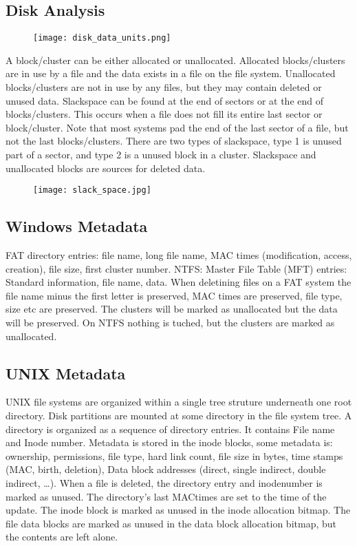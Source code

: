 \subsection{Disk Analysis}
\begin{figure}[h]
    \centering\texttt{[image: disk\_data\_units.png]}
\end{figure}
A block/cluster can be either allocated or unallocated. Allocated 
blocks/clusters are in use by a file and the data exists in a file on the file 
system. Unallocated blocks/clusters are not in use by any files, but they may 
contain deleted or unused data. Slackspace can be found at the end of sectors or
at the end of blocks/clusters. This occurs when a file does not fill its entire 
last sector or block/cluster. Note that most systems pad the end of the last 
sector of a file, but not the last blocks/clusters. There are two types of
slackspace, type 1 is unused part of a sector, and type 2 is a unused block
in a cluster. Slackspace and unallocated blocks are sources for deleted data.
\begin{figure}[h]
    \centering\texttt{[image: slack\_space.jpg]}
\end{figure}

\subsection{Windows Metadata}
FAT directory entries: file name, long file name, MAC times (modification, 
access, creation), file size, first cluster number. NTFS: Master File Table
(MFT) entries: Standard information, file name, data. When deletining files on a
FAT system the file name minus the first letter is preserved, MAC times are 
preserved, file type, size etc are preserved. The clusters will be marked as 
unallocated but the data will be preserved. On NTFS nothing is tuched, but the
clusters are marked as unallocated. 

\subsection{UNIX Metadata}
UNIX file systems are organized within a single tree struture underneath one 
root directory. Disk partitions are mounted at some directory in the file 
system tree. A directory is organized as a sequence of directory entries. It 
contains File name and Inode number. Metadata is stored in the inode blocks,
some metadata is: ownership, permissions, file type, hard link count, file size
in bytes, time stamps (MAC, birth, deletion), Data block addresses (direct, 
single indirect, double indirect, \ldots). When a file is deleted, the directory
entry and inodenumber is marked as unused. The directory’s last MACtimes are set
to the time of the update. The inode block is marked as unused in the inode 
allocation bitmap. The file data blocks are marked as unused in the data block 
allocation bitmap, but the contents are left alone.




